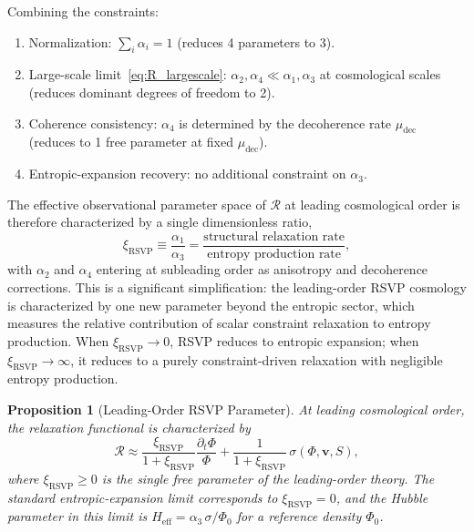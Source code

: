 \documentclass[12pt,a4paper]{article}
\newtheorem{proposition}[theorem]{Proposition}
\theoremstyle{remark}
\newcommand{\vv}{\mathbf{v}}
\newcommand{\Rcal}{\mathcal{R}}
\begin{document}
Combining the constraints:
\begin{enumerate}[leftmargin=2em]
\item Normalization: $\sum_i \alpha_i = 1$ (reduces 4 parameters to 3).
\item Large-scale limit~\eqref{eq:R_largescale}: $\alpha_2, \alpha_4 \ll \alpha_1, \alpha_3$
  at cosmological scales (reduces dominant degrees of freedom to 2).
\item Coherence consistency: $\alpha_4$ is determined by the decoherence rate
  $\mu_{\mathrm{dec}}$ (reduces to 1 free parameter at fixed $\mu_{\mathrm{dec}}$).
\item Entropic-expansion recovery: no additional constraint on $\alpha_3$.
\end{enumerate}
The effective observational parameter space of $\Rcal$ at leading cosmological
order is therefore characterized by a single dimensionless ratio,
\begin{equation}
\boxed{\xi_{\mathrm{RSVP}} \equiv \frac{\alpha_1}{\alpha_3}
= \frac{\text{structural relaxation rate}}{\text{entropy production rate}},}
\label{eq:xi_ratio}
\end{equation}
with $\alpha_2$ and $\alpha_4$ entering at subleading order as anisotropy and
decoherence corrections. This is a significant simplification: the leading-order
RSVP cosmology is characterized by one new parameter beyond the entropic sector,
which measures the relative contribution of scalar constraint relaxation to
entropy production. When $\xi_{\mathrm{RSVP}} \to 0$, RSVP reduces to entropic
expansion; when $\xi_{\mathrm{RSVP}} \to \infty$, it reduces to a purely
constraint-driven relaxation with negligible entropy production.

\begin{proposition}[Leading-Order RSVP Parameter]
At leading cosmological order, the relaxation functional is characterized by
\begin{equation}
\Rcal \approx \frac{\xi_{\mathrm{RSVP}}}{1+\xi_{\mathrm{RSVP}}}
\frac{\partial_t\Phi}{\Phi}
+ \frac{1}{1+\xi_{\mathrm{RSVP}}}\,\sigma(\Phi,\vv,S),
\end{equation}
where $\xi_{\mathrm{RSVP}} \ge 0$ is the single free parameter of the leading-order
theory. The standard entropic-expansion limit corresponds to $\xi_{\mathrm{RSVP}} = 0$,
and the Hubble parameter in this limit is $H_{\mathrm{eff}} = \alpha_3\,\sigma/\Phi_0$
for a reference density $\Phi_0$.
\end{proposition}

\end{document}
